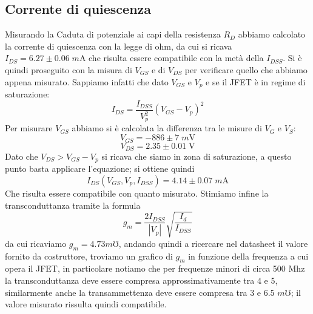 \documentclass[10pt, a4paper, italian]{article}
\begin{document}
\subsection{Corrente di quiescenza}
Misurando la Caduta di potenziale ai capi della resistenza $R_D$ abbiamo calcolato la corrente di quiescenza con la legge di ohm, da cui si ricava $I_{DS}=6.27 \pm 0.06 \; \si{m\A}$ che risulta essere compatibile con la metà della $I_{DSS}$.
Si è quindi proseguito con la misura di $V_{GS}$ e di $V_{DS}$ per verificare quello che abbiamo appena misurato.
Sappiamo infatti che dato $V_{GS}$ e $V_p$ e se il JFET è in regime di saturazione:
\begin{equation}
I_{DS}=\frac{I_{DSS}}{V_p ^2}(V_{GS}-V_p)^2
\end{equation}
Per misurare $V_{GS}$ abbiamo si è calcolata la differenza tra le misure di $V_G$ e $V_S$:
\[
V_{GS}=-886 \pm 7 \; \si{m\V}
\]
\[
V_{DS}=2.35 \pm 0.01 \; \si{\V}
\]
Dato che $V_{DS} > V_{GS} - V_p$ si ricava che siamo in zona di saturazione, a questo punto basta applicare l'equazione; si ottiene quindi 
\[
I_{DS}(V_{GS},V_p,I_{DSS})=4.14 \pm 0.07 \; \si{m\A}
\]
Che risulta essere compatibile con quanto misurato.
Stimiamo infine la transconduttanza tramite la formula
\begin{equation}
g_m = \frac{2 I_{DSS}}{|V_p|}\sqrt{\frac{I_{d}}{I_{DSS}}}
\end{equation}
da cui ricaviamo $g_m = 4.73 \si{m\mho}$, andando quindi a ricercare nel datasheet il valore fornito da costruttore, troviamo un grafico di $g_m$ in funzione della frequenza a cui opera il JFET, in particolare notiamo che per frequenze minori di circa 500 Mhz la transconduttanza deve essere compresa approssimativamente tra 4 e 5, similarmente anche la transammettenza deve essere compresa tra 3 e 6.5 $\si{m\mho}$; il valore misurato rissulta quindi compatibile.
\end{document}
